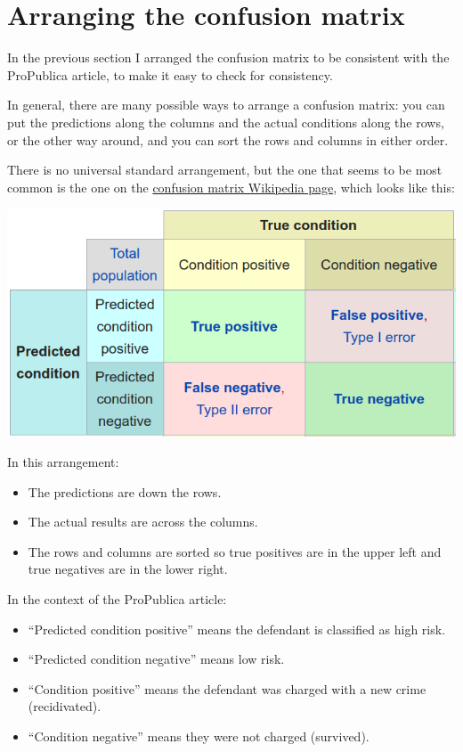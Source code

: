 \hypertarget{arranging-the-confusion-matrix}{%
\section{Arranging the confusion
matrix}\label{arranging-the-confusion-matrix}}

In the previous section I arranged the confusion matrix to be consistent
with the ProPublica article, to make it easy to check for consistency.

In general, there are many possible ways to arrange a confusion matrix:
you can put the predictions along the columns and the actual conditions
along the rows, or the other way around, and you can sort the rows and
columns in either order.

There is no universal standard arrangement, but the one that seems to be
most common is the one on the
\href{https://en.wikipedia.org/wiki/Confusion_matrix}{confusion matrix
Wikipedia page}, which looks like this:

\includegraphics{figs/confusion_matrix1.png}

In this arrangement:

\begin{itemize}
\item
  The predictions are down the rows.
\item
  The actual results are across the columns.
\item
  The rows and columns are sorted so true positives are in the upper
  left and true negatives are in the lower right.
\end{itemize}

In the context of the ProPublica article:

\begin{itemize}
\item
  ``Predicted condition positive'' means the defendant is classified as
  high risk.
\item
  ``Predicted condition negative'' means low risk.
\item
  ``Condition positive'' means the defendant was charged with a new
  crime (recidivated).
\item
  ``Condition negative'' means they were not charged (survived).
\end{itemize}

